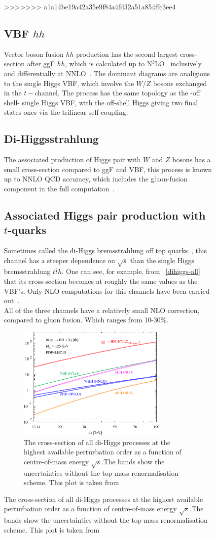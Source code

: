\begin{figure}[!htpb]
>>>>>>> a1a14be19a42a35e9f84a4fd32a51a854ffc3ee4
\subsection{VBF $hh$}
Vector boson fusion $hh$ production has the second largest cross-section after ggF $hh$, which is calculated up to N$^3$LO~\cite{Baglio:2012np,Ling:2014sne,Dreyer:2018qbw} inclusively and differentially at NNLO~\cite{Dreyer:2018rfu}. The dominant diagrams are analigious to the single Higgs VBF, which involve the $W/Z$ bosons exchanged in the $t-$channel. The process has the same topology as the -off shell- single Higgs VBF, with the off-shell Higgs giving two final states ones via the trilinear self-coupling. 
\subsection{Di-Higgsstrahlung}
The associated production of Higgs pair with $W$ and $Z$ bosons has a small cross-section compared to ggF and VBF,  this process is known up to NNLO QCD accuracy, which includes the gluon-fusion component in the full computation~\cite{aglio:2012np,Li:2016nrr,Li:2017lbf}. 
\subsection{Associated Higgs pair production with $t$-quarks}
Sometimes called the di-Higgs bremsstrahlung off top quarks~\cite{DiMicco:2019ngk}, this channel has a steeper dependence on $\sqrt{s}$ than the single Higgs bremsstrahlung $t\bar t h$. One can see, for example, from ~\autoref{dihiggs-all} that its cross-section becomes at  roughly the same  values as the VBF's. Only NLO computations for this channels have been carried out~\cite{Frederix:2014hta}. \\ All of the three channels have a relatively small NLO correction, compared to gluon fusion. Which ranges from 10-30\%. 
\begin{figure}[!htpb]
	\centering
	\includegraphics[width = 0.8\textwidth]{./figures/cxn_HH}
	\caption{The cross-section of all di-Higgs processes at the highest available perturbation order as a function of centre-of-mass energy $\sqrt{s}$.The bands show the uncertainties without the top-mass renormalisation scheme. This plot is taken from~\cite{DiMicco:2019ngk}} 
	\label{dihiggs-all}
\end{figure}
%


\end{figure}
